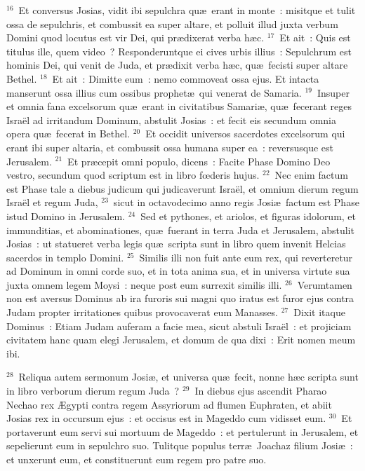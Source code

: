 ${}^{16}$~Et conversus Josias, vidit ibi sepulchra qu\ae\ erant in monte~: misitque et tulit ossa de sepulchris, et combussit ea super altare, et polluit illud juxta verbum Domini quod locutus est vir Dei, qui pr\ae dixerat verba h\ae c.
${}^{17}$~Et ait~: Quis est titulus ille, quem video~? Responderuntque ei cives urbis illius~: Sepulchrum est hominis Dei, qui venit de Juda, et pr\ae dixit verba h\ae c, qu\ae\ fecisti super altare Bethel.
${}^{18}$~Et ait~: Dimitte eum~: nemo commoveat ossa ejus. Et intacta manserunt ossa illius cum ossibus prophet\ae\ qui venerat de Samaria.
${}^{19}$~Insuper et omnia fana excelsorum qu\ae\ erant in civitatibus Samari\ae , qu\ae\ fecerant reges Isra\"el ad irritandum Dominum, abstulit Josias~: et fecit eis secundum omnia opera qu\ae\ fecerat in Bethel.
${}^{20}$~Et occidit universos sacerdotes excelsorum qui erant ibi super altaria, et combussit ossa humana super ea~: reversusque est Jerusalem.
${}^{21}$~Et pr\ae cepit omni populo, dicens~: Facite Phase Domino Deo vestro, secundum quod scriptum est in libro fœderis hujus.
${}^{22}$~Nec enim factum est Phase tale a diebus judicum qui judicaverunt Isra\"el, et omnium dierum regum Isra\"el et regum Juda,
${}^{23}$~sicut in octavodecimo anno regis Josi\ae\ factum est Phase istud Domino in Jerusalem.
${}^{24}$~Sed et pythones, et ariolos, et figuras idolorum, et immunditias, et abominationes, qu\ae\ fuerant in terra Juda et Jerusalem, abstulit Josias~: ut statueret verba legis qu\ae\ scripta sunt in libro quem invenit Helcias sacerdos in templo Domini.
${}^{25}$~Similis illi non fuit ante eum rex, qui reverteretur ad Dominum in omni corde suo, et in tota anima sua, et in universa virtute sua juxta omnem legem Moysi~: neque post eum surrexit similis illi.
${}^{26}$~Verumtamen non est aversus Dominus ab ira furoris sui magni quo iratus est furor ejus contra Judam propter irritationes quibus provocaverat eum Manasses.
${}^{27}$~Dixit itaque Dominus~: Etiam Judam auferam a facie mea, sicut abstuli Isra\"el~: et projiciam civitatem hanc quam elegi Jerusalem, et domum de qua dixi~: Erit nomen meum ibi.


${}^{28}$~Reliqua autem sermonum Josi\ae , et universa qu\ae\ fecit, nonne h\ae c scripta sunt in libro verborum dierum regum Juda~?
${}^{29}$~In diebus ejus ascendit Pharao Nechao rex \AE gypti contra regem Assyriorum ad flumen Euphraten, et abiit Josias rex in occursum ejus~: et occisus est in Mageddo cum vidisset eum.
${}^{30}$~Et portaverunt eum servi sui mortuum de Mageddo~: et pertulerunt in Jerusalem, et sepelierunt eum in sepulchro suo. Tulitque populus terr\ae\ Joachaz filium Josi\ae~: et unxerunt eum, et constituerunt eum regem pro patre suo.


